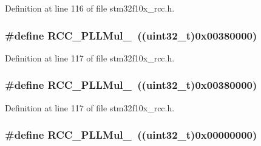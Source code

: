 Definition at line 116 of file stm32f10x\+\_\+rcc.\+h.

\subsubsection[{\texorpdfstring{R\+C\+C\+\_\+\+P\+L\+L\+Mul\+\_\+16}{RCC_PLLMul_16}}]{\setlength{\rightskip}{0pt plus 5cm}\#define R\+C\+C\+\_\+\+P\+L\+L\+Mul\+\_~(({\bf uint32\+\_\+t})0x00380000)}\hypertarget{group___p_l_l__multiplication__factor_ga98118a80e57ed822485df8a8bef3cb1f}{}\label{group___p_l_l__multiplication__factor_ga98118a80e57ed822485df8a8bef3cb1f}


Definition at line 117 of file stm32f10x\+\_\+rcc.\+h.

\subsubsection[{\texorpdfstring{R\+C\+C\+\_\+\+P\+L\+L\+Mul\+\_\+16}{RCC_PLLMul_16}}]{\setlength{\rightskip}{0pt plus 5cm}\#define R\+C\+C\+\_\+\+P\+L\+L\+Mul\+\_~(({\bf uint32\+\_\+t})0x00380000)}\hypertarget{group___p_l_l__multiplication__factor_ga98118a80e57ed822485df8a8bef3cb1f}{}\label{group___p_l_l__multiplication__factor_ga98118a80e57ed822485df8a8bef3cb1f}


Definition at line 117 of file stm32f10x\+\_\+rcc.\+h.

\subsubsection[{\texorpdfstring{R\+C\+C\+\_\+\+P\+L\+L\+Mul\+\_\+2}{RCC_PLLMul_2}}]{\setlength{\rightskip}{0pt plus 5cm}\#define R\+C\+C\+\_\+\+P\+L\+L\+Mul\+\_~(({\bf uint32\+\_\+t})0x00000000)}\hypertarget{group___p_l_l__multiplication__factor_ga91b3b28fa4d56693d1eb361e24f317af}{}\label{group___p_l_l__multiplication__factor_ga91b3b28fa4d56693d1eb361e24f317af}


